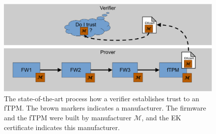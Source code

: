 \begin{figure}[htpb]
  \centering
  \includegraphics[width=1\linewidth]{figures/current_state.pdf}
  \caption{The state-of-the-art process how a verifier establishes trust to an \ac{fTPM}. The brown markers indicates a manufacturer. The firmware and the fTPM were built by manufacturer $\mathcal{M}$, and the EK certificate indicates this manufacturer.} \label{fig:current_state}
\end{figure}
